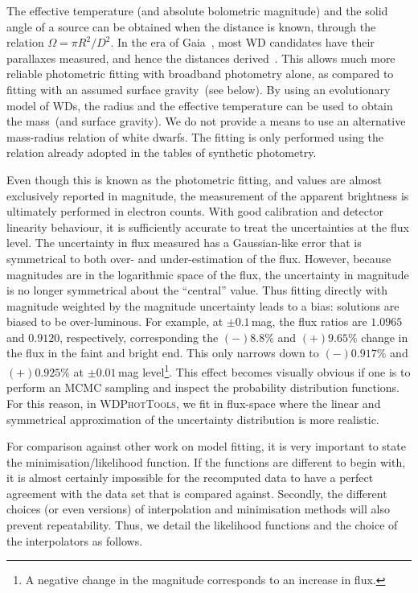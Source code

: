 \documentclass[fleqn,usenatbib]{rasti}
\begin{document}
The effective temperature (and absolute bolometric magnitude) and the solid
angle of a source can be obtained when the distance is known, through the
relation $\Omega = \pi R^2 / D^2$. In the era of
Gaia~\citep{2021A&A...649A...1G}, most WD candidates have
their parallaxes measured, and hence the distances
derived~\citep{2021AJ....161..147B}. This allows much more reliable photometric
fitting with broadband photometry alone, as compared to fitting with an assumed
surface gravity~(see below). By using an evolutionary model of WDs, the radius
and the effective temperature can be used to obtain the mass~(and surface
gravity). We do not provide a means to use an alternative
mass-radius relation of white dwarfs. The fitting is only performed using the
relation already adopted in the tables of synthetic photometry.

Even though this is known as the photometric fitting, and values are almost
exclusively reported in magnitude, the measurement of the apparent brightness
is ultimately performed in electron counts. With good calibration and detector
linearity behaviour, it is sufficiently accurate to treat the uncertainties
at the flux level. The uncertainty in flux measured has a Gaussian-like error
that is symmetrical to both over- and under-estimation of the flux. However, because magnitudes are in the logarithmic space of the flux, the
uncertainty in magnitude is no longer symmetrical about the ``central'' value.
Thus fitting directly with magnitude weighted by the magnitude uncertainty
leads to a bias: solutions are biased to be over-luminous. For example, at
$\pm0.1$\,mag, the flux ratios are $1.0965$ and $0.9120$, respectively,
corresponding the $(-)8.8\%$ and $(+)9.65\%$ change in the flux in the faint
and bright end. This only narrows down to $(-)0.917\%$ and $(+)0.925\%$ at
$\pm0.01\,$mag level\footnote{A negative change in the magnitude corresponds
to an increase in flux.}. This effect becomes visually obvious if one is to
perform an MCMC sampling and inspect the probability distribution functions.
For this reason, in \textsc{WDPhotTools}, we fit in flux-space where the linear
and symmetrical approximation of the uncertainty distribution is more
realistic.

For comparison against other work on model fitting, it is very important to
state the minimisation/likelihood function. If the functions are different to
begin with, it is almost certainly impossible for the recomputed data to
have a perfect agreement with the data set that is compared against. Secondly, the
different choices (or even versions) of interpolation and minimisation methods
will also prevent repeatability. Thus, we detail the likelihood functions
and the choice of the interpolators as follows.
\end{document}

